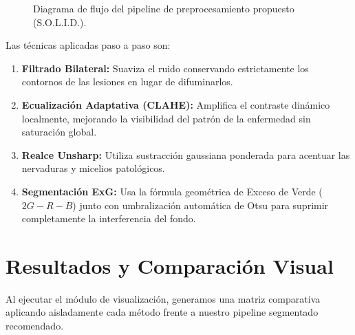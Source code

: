 \documentclass[11pt,a4paper]{article}
\begin{document}
\begin{figure}[H]
    \centering
    \caption{Diagrama de flujo del pipeline de preprocesamiento propuesto (S.O.L.I.D.).}
    \label{fig:flowchart}
\end{figure}

Las técnicas aplicadas paso a paso son:
\begin{enumerate}
    \item \textbf{Filtrado Bilateral:} Suaviza el ruido conservando estrictamente los contornos de las lesiones en lugar de difuminarlos.
    \item \textbf{Ecualización Adaptativa (CLAHE):} Amplifica el contraste dinámico localmente, mejorando la visibilidad del patrón de la enfermedad sin saturación global.
    \item \textbf{Realce Unsharp:} Utiliza sustracción gaussiana ponderada para acentuar las nervaduras y micelios patológicos.
    \item \textbf{Segmentación ExG:} Usa la fórmula geométrica de Exceso de Verde ($2G - R - B$) junto con umbralización automática de Otsu para suprimir completamente la interferencia del fondo.
\end{enumerate}

\section{Resultados y Comparación Visual}

Al ejecutar el módulo de visualización, generamos una matriz comparativa aplicando aisladamente cada método frente a nuestro pipeline segmentado recomendado. 
\end{document}
